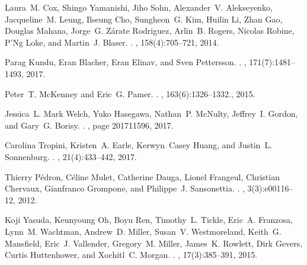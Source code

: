 \newpage



\begin{thebibliography}{10}
	
	Laura~M. Cox, Shingo Yamanishi, Jiho Sohn, Alexander~V. Alekseyenko,
	Jacqueline~M. Leung, Ilseung Cho, Sungheon~G. Kim, Huilin Li, Zhan Gao,
	Douglas Mahana, Jorge~G. {Z{\'{a}}rate Rodriguez}, Arlin~B. Rogers, Nicolas
	Robine, P'Ng Loke, and Martin~J. Blaser.
	.
	, 158(4):705--721, 2014.
	
	Parag Kundu, Eran Blacher, Eran Elinav, and Sven Pettersson.
	.
	, 171(7):1481--1493, 2017.
	
	Peter~T. McKenney and Eric~G. Pamer.
	.
	, 163(6):1326--1332., 2015.
	
	Jessica~L. {Mark Welch}, Yuko Hasegawa, Nathan~P. McNulty, Jeffrey~I. Gordon,
	and Gary~G. Borisy.
	.
	, page
	201711596, 2017.
	
	Carolina Tropini, Kristen~A. Earle, Kerwyn~Casey Huang, and Justin~L.
	Sonnenburg.
	.
	, 21(4):433--442, 2017.
	
	Thierry P{\'{e}}dron, C{\'{e}}line Mulet, Catherine Dauga, Lionel Frangeul,
	Christian Chervaux, Gianfranco Grompone, and Philippe~J. Sansonettia.
	.
	, 3(3):e00116--12, 2012.
	
	Koji Yasuda, Keunyoung Oh, Boyu Ren, Timothy~L. Tickle, Eric~A. Franzosa,
	Lynn~M. Wachtman, Andrew~D. Miller, Susan~V. Westmoreland, Keith~G.
	Mansfield, Eric~J. Vallender, Gregory~M. Miller, James~K. Rowlett, Dirk
	Gevers, Curtis Huttenhower, and Xochitl~C. Morgan.
	.
	, 17(3):385--391, 2015.
	

\end{thebibliography}

